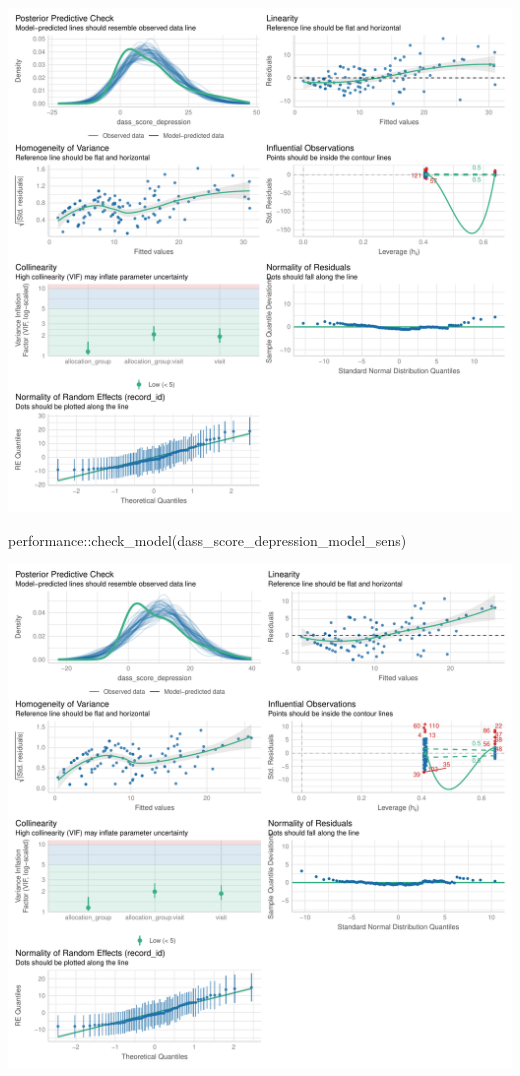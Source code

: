 \documentclass[
  letterpaper,
  DIV=11,
  numbers=noendperiod]{scrartcl}
\newenvironment{Shaded}{\begin{snugshade}}{\end{snugshade}}
\newcommand{\FunctionTok}[1]{\textcolor[rgb]{0.28,0.35,0.67}{#1}}
\newcommand{\NormalTok}[1]{\textcolor[rgb]{0.00,0.23,0.31}{#1}}
\newcommand{\SpecialCharTok}[1]{\textcolor[rgb]{0.37,0.37,0.37}{#1}}
\begin{document}
\includegraphics{Outcomes_V1V2V3_files/figure-pdf/dass_score_depression_4-1.pdf}

\begin{Shaded}
\begin{Highlighting}[]
\NormalTok{performance}\SpecialCharTok{::}\FunctionTok{check\_model}\NormalTok{(dass\_score\_depression\_model\_sens)}
\end{Highlighting}
\end{Shaded}

\includegraphics{Outcomes_V1V2V3_files/figure-pdf/dass_score_depression_4-2.pdf}
\end{document}
